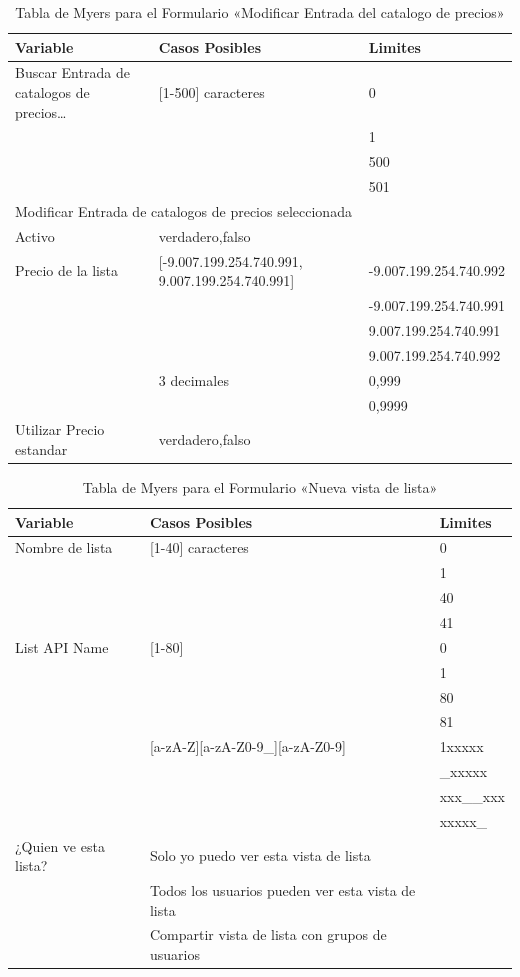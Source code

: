 \begin{table}
\centering
\begin{tabular}{|p{5.0cm}|p{5.0cm}|l|}
\hline
\textbf{Variable} & \textbf{Casos Posibles} & \textbf{Limites} \\
\hline
Buscar Entrada de catalogos de precios\ldots & [1-500] caracteres & 0 \\
& & 1 \\
& & 500 \\
& & 501 \\
\hline
\multicolumn{3}{|l|}{Modificar Entrada de catalogos de precios seleccionada} \\
\hline
Activo  & {verdadero,falso} & \\
\hline
Precio de la lista & [-9.007.199.254.740.991, 9.007.199.254.740.991] & -9.007.199.254.740.992 \\
& & -9.007.199.254.740.991 \\
& & 9.007.199.254.740.991 \\
& & 9.007.199.254.740.992 \\
& 3 decimales & 0,999 \\
& & 0,9999 \\
\hline
Utilizar Precio estandar & {verdadero,falso} & \\
\hline
\end{tabular}
\caption{Tabla de Myers para el Formulario «Modificar Entrada del catalogo de precios»}
\label{myers_06}
\end{table}

\begin{table}
\centering
\begin{tabular}{|l|l|l|}
\hline
\textbf{Variable} & \textbf{Casos Posibles} & \textbf{Limites} \\
\hline
Nombre de lista & [1-40] caracteres & 0 \\
& & 1 \\
& & 40 \\
& & 41 \\
\hline
List API Name & [1-80] & 0 \\
& & 1 \\
& & 80 \\
& & 81 \\
& [a-zA-Z][a-zA-Z0-9\_][a-zA-Z0-9] & 1xxxxx \\
& & \_xxxxx \\
& & xxx\_\_xxx \\
& & xxxxx\_ \\
\hline
¿Quien ve esta lista? & Solo yo puedo ver esta vista de lista & \\
& Todos los usuarios pueden ver esta vista de lista & \\
& Compartir vista de lista con grupos de usuarios & \\
\hline
\end{tabular}
\caption{Tabla de Myers para el Formulario «Nueva vista de lista»}
\label{myers_07}
\end{table}

